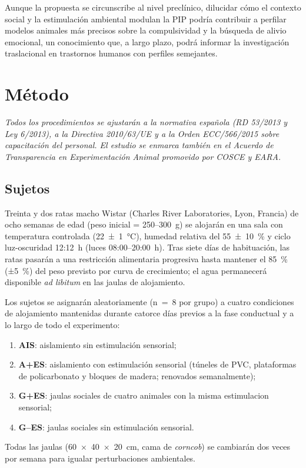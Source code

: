 \documentclass[12pt,a4paper]{article}
\begin{document}
\begin{multicols}{2}
Aunque la propuesta se circunscribe al nivel preclínico, dilucidar cómo el contexto social y la estimulación ambiental modulan la PIP podría contribuir a perfilar modelos animales más precisos sobre la compulsividad y la búsqueda de alivio emocional, un conocimiento que, a largo plazo, podrá informar la investigación traslacional en trastornos humanos con perfiles semejantes.


\section{Método}

\textit{Todos los procedimientos se ajustarán a la normativa española (RD 53/2013 y Ley 6/2013), a la Directiva 2010/63/UE y a la Orden ECC/566/2015 sobre capacitación del personal. El estudio se enmarca también en el Acuerdo de Transparencia en Experimentación Animal promovido por COSCE y EARA.}

\subsection*{Sujetos}

Treinta y dos ratas macho Wistar (Charles River Laboratories, Lyon, Francia) de ocho semanas de edad (peso inicial = 250–300~g) se alojarán en una sala con temperatura controlada (22~±~1~°C), humedad relativa del 55~±~10~\% y ciclo luz-oscuridad 12:12~h (luces 08:00–20:00~h). Tras siete días de habituación, las ratas pasarán a una restricción alimentaria progresiva hasta mantener el 85~\% (±5~\%) del peso previsto por curva de crecimiento; el agua permanecerá disponible \textit{ad libitum} en las jaulas de alojamiento.

Los sujetos se asignarán aleatoriamente (n~=~8 por grupo) a cuatro condiciones de alojamiento mantenidas durante catorce días previos a la fase conductual y a lo largo de todo el experimento: 
\begin{enumerate}
    \item \textbf{AIS}: aislamiento sin estimulación sensorial;
    \item \textbf{A+ES}: aislamiento con estimulación sensorial (túneles de PVC, plataformas de policarbonato y bloques de madera; renovados semanalmente);
    \item \textbf{G+ES}: jaulas sociales de cuatro animales con la misma estimulacion sensorial;
    \item \textbf{G--ES}: jaulas sociales sin estimulación sensorial.
\end{enumerate}
Todas las jaulas (60~×~40~×~20~cm, cama de \textit{corncob}) se cambiarán dos veces por semana para igualar perturbaciones ambientales.


\end{multicols}
\end{document}
